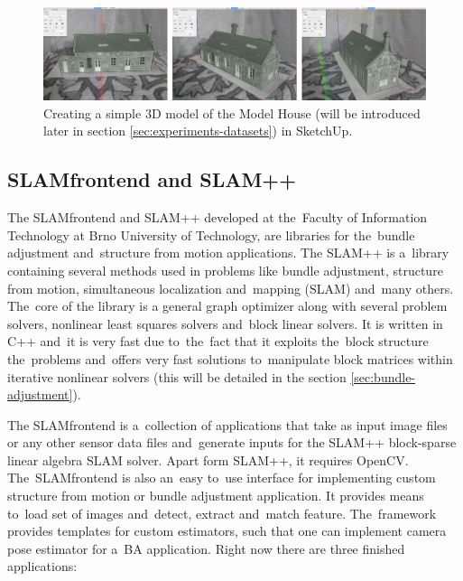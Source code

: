 \begin{figure}[ht]
	\begin{center}
		\includegraphics[keepaspectratio,width=\textwidth]{fig/sketchup_modelhouse.pdf}
	\end{center}
	\caption{Creating a simple 3D model of the Model House (will be introduced later in section \ref{sec:experiments-datasets}) in SketchUp.}
	\label{fig:sketchup}
\end{figure}

\subsection*{SLAM\textunderscore frontend and SLAM++}
The SLAM\textunderscore frontend  and SLAM++ developed at the~Faculty of Information Technology at Brno University of Technology, are libraries for the~bundle adjustment and~structure from motion applications. The SLAM++ is a~library containing several methods used in problems like bundle adjustment, structure from motion, simultaneous localization and~mapping (SLAM) and~many others. The~core of the library is a general graph optimizer along with several problem solvers, nonlinear least squares solvers and~block linear solvers. It is written in C++ and~it is very fast due to~the~fact that it exploits the~block structure the~problems and~offers very fast solutions to~manipulate block matrices within iterative nonlinear solvers (this will be detailed in the section \ref{sec:bundle-adjustment}).

The SLAM\textunderscore frontend \cite{www:slam_frontend} is a~collection of applications that take as input image files or any other sensor data files and~generate inputs for the SLAM++ block-sparse linear algebra SLAM solver. Apart form SLAM++, it requires OpenCV. The~SLAM\textunderscore frontend is also an~easy to~use interface for implementing custom structure from motion or bundle adjustment application. It provides means to~load set of images and~detect, extract and~match feature. The~framework provides templates for custom estimators, such that one can implement camera pose estimator for a~BA application. Right now there are three finished applications:

